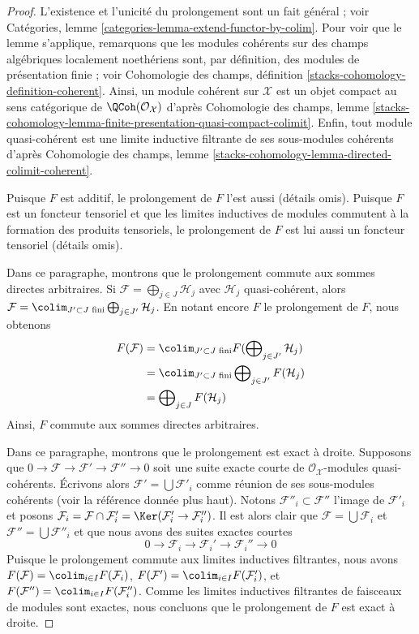 \begin{proof}
L'existence et l'unicité du prolongement sont un fait général ; voir
Catégories, lemme \ref{categories-lemma-extend-functor-by-colim}.
Pour voir que le lemme s'applique, remarquons que les modules cohérents sur des
champs algébriques localement noethériens sont, par définition, des modules
de présentation finie ; voir
Cohomologie des champs, définition \ref{stacks-cohomology-definition-coherent}.
Ainsi, un module cohérent sur $\mathcal{X}$ est un
objet compact au sens catégorique de $\QCoh(\mathcal{O}_\mathcal{X})$ d'après
Cohomologie des champs, lemme
\ref{stacks-cohomology-lemma-finite-presentation-quasi-compact-colimit}.
Enfin, tout module quasi-cohérent est une limite inductive filtrante de
ses sous-modules cohérents d'après Cohomologie des champs, lemme
\ref{stacks-cohomology-lemma-directed-colimit-coherent}.

\medskip\noindent
Puisque $F$ est additif, le prolongement de $F$ l'est aussi (détails omis).
Puisque $F$ est un foncteur tensoriel et que les limites inductives de modules
commutent à la formation des produits tensoriels, le prolongement de $F$
est lui aussi un foncteur tensoriel (détails omis).

\medskip\noindent
Dans ce paragraphe, montrons que le prolongement commute aux sommes directes
arbitraires. Si $\mathcal{F} = \bigoplus_{j \in J} \mathcal{H}_j$
avec $\mathcal{H}_j$ quasi-cohérent, alors
$\mathcal{F} = \colim_{J' \subset J\text{ fini}}
\bigoplus_{j \in J'} \mathcal{H}_j$.
En notant encore $F$ le prolongement de $F$, nous obtenons
\begin{align*}
F(\mathcal{F})
& =
\colim_{J' \subset J\text{ fini}}
F(\bigoplus\nolimits_{j \in J'} \mathcal{H}_j) \\
& =
\colim_{J' \subset J\text{ fini}}
\bigoplus\nolimits_{j \in J'} F(\mathcal{H}_j) \\
& =
\bigoplus\nolimits_{j \in J} F(\mathcal{H}_j)
\end{align*}
Ainsi, $F$ commute aux sommes directes arbitraires.

\medskip\noindent
Dans ce paragraphe, montrons que le prolongement est exact à droite.
Supposons que $0 \to \mathcal{F} \to \mathcal{F}' \to \mathcal{F}'' \to 0$
soit une suite exacte courte de $\mathcal{O}_\mathcal{X}$-modules quasi-cohérents.
Écrivons alors $\mathcal{F}' = \bigcup \mathcal{F}'_i$ comme
réunion de ses sous-modules cohérents (voir la référence donnée plus haut).
Notons $\mathcal{F}''_i \subset \mathcal{F}''$ l'image de $\mathcal{F}'_i$
et posons $\mathcal{F}_i = \mathcal{F} \cap \mathcal{F}'_i =
\Ker(\mathcal{F}'_i \to \mathcal{F}''_i)$. Il est alors clair que
$\mathcal{F} = \bigcup \mathcal{F}_i$ et
$\mathcal{F}'' = \bigcup \mathcal{F}''_i$
et que nous avons des suites exactes courtes
$$
0 \to \mathcal{F}_i \to \mathcal{F}_i' \to \mathcal{F}_i'' \to 0
$$
Puisque le prolongement commute aux limites inductives filtrantes, nous avons
$F(\mathcal{F}) = \colim_{i \in I} F(\mathcal{F}_i)$,
$F(\mathcal{F}') = \colim_{i \in I} F(\mathcal{F}'_i)$, et
$F(\mathcal{F}'') = \colim_{i \in I} F(\mathcal{F}''_i)$.
Comme les limites inductives filtrantes de faisceaux de modules sont exactes, nous
concluons que le prolongement de $F$ est exact à droite.


\end{proof}
